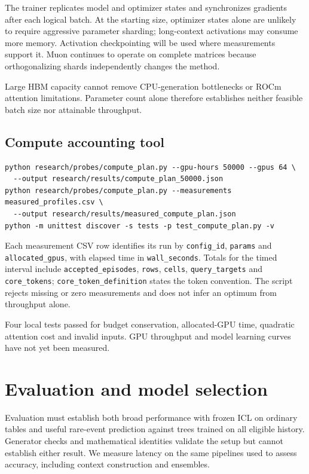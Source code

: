 \documentclass[11pt]{article}
\begin{document}
The trainer replicates model and optimizer states and synchronizes gradients after each logical batch. At the starting size, optimizer states alone are unlikely to require aggressive parameter sharding; long-context activations may consume more memory. Activation checkpointing will be used where measurements support it. Muon continues to operate on complete matrices because orthogonalizing shards independently changes the method.

Large HBM capacity cannot remove CPU-generation bottlenecks or ROCm attention limitations. Parameter count alone therefore establishes neither feasible batch size nor attainable throughput.

\subsection{Compute accounting tool}

\begin{lstlisting}
python research/probes/compute_plan.py --gpu-hours 50000 --gpus 64 \
  --output research/results/compute_plan_50000.json
python research/probes/compute_plan.py --measurements measured_profiles.csv \
  --output research/results/measured_compute_plan.json
python -m unittest discover -s tests -p test_compute_plan.py -v
\end{lstlisting}
Each measurement CSV row identifies its run by \texttt{config\_id}, \texttt{params} and \texttt{allocated\_gpus}, with elapsed time in \texttt{wall\_seconds}. Totals for the timed interval include \texttt{accepted\_episodes}, \texttt{rows}, \texttt{cells}, \texttt{query\_targets} and \texttt{core\_tokens}; \texttt{core\_token\_definition} states the token convention. The script rejects missing or zero measurements and does not infer an optimum from throughput alone.

Four local tests passed for budget conservation, allocated-GPU time, quadratic attention cost and invalid inputs. GPU throughput and model learning curves have not yet been measured.



\section{Evaluation and model selection}
\label{sec:evaluation}

Evaluation must establish both broad performance with frozen ICL on ordinary tables and useful rare-event prediction against trees trained on all eligible history. Generator checks and mathematical identities validate the setup but cannot establish either result. We measure latency on the same pipelines used to assess accuracy, including context construction and ensembles.
\end{document}
